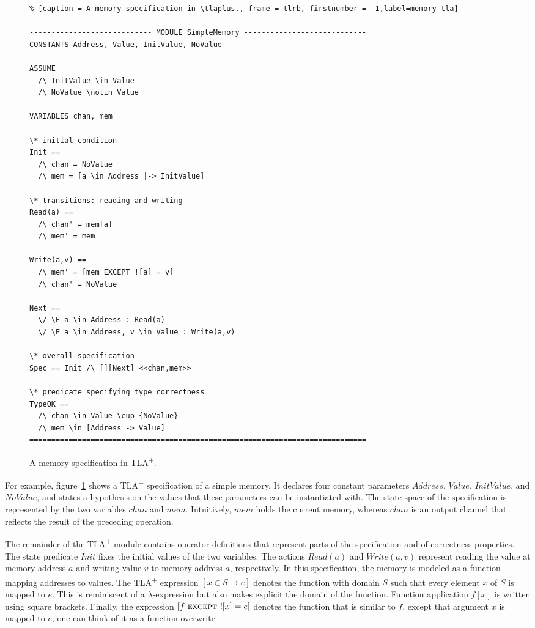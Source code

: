 \documentclass{thesul}
\newcommand{\tlaplus}{TLA\textsuperscript{+}\xspace}
\newcommand{\EXCEPT}{\textsc{except}}
\begin{document}
\begin{figure}
\begin{lstlisting}% [caption = A memory specification in \tlaplus., frame = tlrb, firstnumber =  1,label=memory-tla]

---------------------------- MODULE SimpleMemory ----------------------------
CONSTANTS Address, Value, InitValue, NoValue

ASSUME 
  /\ InitValue \in Value
  /\ NoValue \notin Value

VARIABLES chan, mem

\* initial condition
Init == 
  /\ chan = NoValue
  /\ mem = [a \in Address |-> InitValue]

\* transitions: reading and writing
Read(a) == 
  /\ chan' = mem[a]
  /\ mem' = mem

Write(a,v) ==
  /\ mem' = [mem EXCEPT ![a] = v]
  /\ chan' = NoValue

Next ==
  \/ \E a \in Address : Read(a)
  \/ \E a \in Address, v \in Value : Write(a,v)

\* overall specification
Spec == Init /\ [][Next]_<<chan,mem>>

\* predicate specifying type correctness
TypeOK == 
  /\ chan \in Value \cup {NoValue}
  /\ mem \in [Address -> Value] 
=============================================================================
\end{lstlisting}
\caption{A memory specification in \tlaplus.}
\label{memory-tla}
\end{figure}

For example, figure~\ref{memory-tla} shows a \tlaplus specification of a simple memory. It declares four constant parameters $Address$, $Value$, $InitValue$, and $NoValue$, and states a hypothesis on the values that these parameters can be instantiated with. The state space of the specification is represented by the two variables $chan$ and $mem$. Intuitively, $mem$ holds the current memory, whereas $chan$ is an output channel that reflects the result of the preceding operation.

The remainder of the \tlaplus module contains operator definitions that represent parts of the specification and of correctness properties. The state predicate $Init$ fixes the initial values of the two variables. The actions $Read(a)$ and $Write(a,v)$ represent reading the value at memory address $a$ and writing value $v$ to memory address $a$, respectively. In this specification, the memory is modeled as a function mapping addresses to values. The \tlaplus expression $[x \in S \mapsto e]$ denotes the function with domain $S$ such that every element $x$ of $S$ is mapped to $e$. This is reminiscent of a $\lambda$-expression but also makes explicit the domain of the function. Function application $f[x]$ is written using square brackets. Finally, the expression $[f\ \EXCEPT\ ![x] = e]$ denotes the function that is similar to $f$, except that argument $x$ is mapped to $e$, one can think of it as a function overwrite.
\end{document}
